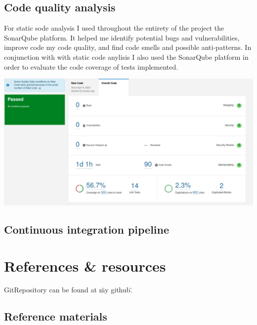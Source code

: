 \documentclass[12pt]{article}
\begin{document}
\begin{itemize}
\end{itemize}

\subsection{Code quality analysis}

For static sode analysis I used throughout the entirety of the project the SonarQube platform. It helped me identify potential bugs and vulnerabilities, improve code my code quality, and find code smells and possible anti-patterns. In conjunction with with static code anylisis I also used the SonarQube platform in order to evaluate the code coverage of tests implemented.

\includegraphics[scale=0.35]{sonarQube.png}

\subsection{Continuous integration pipeline}

\section{References \& resources}

GitRepository can be found at \"my github\".

\subsection{Reference materials}
\end{document}
